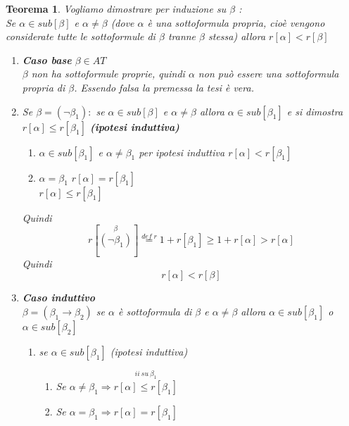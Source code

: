 \documentclass{article}
\newtheorem{theorem}{Teorema}
\theoremstyle{break}
\theoremstyle{break}
\theoremstyle{break}
\theoremstyle{break}
\begin{document}
\begin{theorem}
	Vogliamo dimostrare per induzione su \( \beta \) :\\
	Se \( \alpha \in sub[\beta] \) e \( \alpha \neq \beta \) (dove \( \alpha \)
	è una sottoformula propria, cioè vengono considerate tutte le sottoformule
	di \( \beta \) tranne \( \beta \) stessa)
	allora \( r[\alpha] < r[\beta] \)
	\begin{enumerate}
		\item \textbf{Caso base} \( \beta \in AT \)\\
		      \( \beta \) non ha sottoformule proprie, quindi \( \alpha \)
		      non può essere una sottoformula propria di \( \beta \).
		      Essendo falsa la premessa la tesi è vera.
		\item Se \( \beta=(\neg \beta_1): \) se \( \alpha \in sub[\beta] \) e
		      \( \alpha \neq \beta \)
		      allora \( \alpha \in  sub[\beta_1] \)  e si dimostra
		      \( r[\alpha] \le r[\beta_1] \) \textbf{(ipotesi induttiva)}
		      \begin{enumerate}
			      \item \( \alpha \in sub[\beta_1] \) e \( \alpha \neq \beta_1 \)
			            per ipotesi induttiva \( r[\alpha] < r[\beta_1] \)
			      \item \( \alpha = \beta_1 \) \( r[\alpha] = r[\beta_1] \)\\
			            \( r[\alpha] \le r[\beta_1] \)
		      \end{enumerate}
		      Quindi
		      \[
			      r[\stackrel{\beta}{(\neg \beta_1)}] \stackrel{def\; r}{=} 1 + r[\beta_1]\ge 1+r[\alpha]>r[\alpha]
		      \]
		      Quindi
		      \[
			      r[\alpha] < r[\beta]
		      \]
		\item \textbf{Caso induttivo}\\
		      \( \beta = (\beta_1 \to \beta_2) \) se \( \alpha \)  è
		      sottoformula di \( \beta \) e \( \alpha \neq \beta \)
		      allora \( \alpha \in sub[\beta_1] \) o \( \alpha \in sub[\beta_2]\)
		      \begin{enumerate}
			      \item se \( \alpha \in sub[\beta_1] \) (ipotesi induttiva)
			            \begin{enumerate}
				            \item \label{sub3a1} Se \( \alpha \neq \beta_1 \Rightarrow
				                  \stackrel{ii\: su\: \beta_1 }{r[\alpha] \le r[\beta_1]} \)
				            \item \label{sub3a2} Se \( \alpha = \beta_1 \Rightarrow r[\alpha] = r[\beta_1]\)

\end{enumerate}
\end{enumerate}
\end{enumerate}
\end{theorem}
\end{document}
